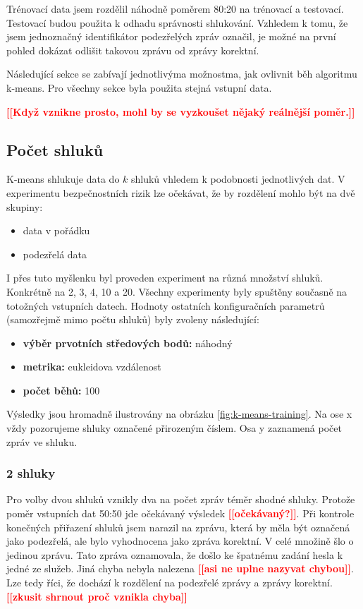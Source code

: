 \documentclass[thesis=M,czech]{FITthesis}[2012/10/20]
\newcommand{\todo}[1]{\textcolor{red}{\textbf{[[#1]]}}}
\begin{document}
		Trénovací data jsem rozdělil náhodně poměrem 80:20 na trénovací a testovací. Testovací budou použita k odhadu správnosti shlukování. Vzhledem k tomu, že jsem jednoznačný identifikátor podezřelých zpráv označil, je možné na první pohled dokázat odlišit takovou zprávu od zprávy korektní.
		
		Následující sekce se zabívají jednotlivýma možnostma, jak ovlivnit běh algoritmu k-means. Pro všechny sekce byla použita stejná vstupní data.
		
		\todo{Když vznikne prosto, mohl by se vyzkoušet nějaký reálnější poměr.}

		\subsection{Počet shluků}
			K-means shlukuje data do $k$ shluků vhledem k podobnosti jednotlivých dat. V experimentu bezpečnostních rizik lze očekávat, že by rozdělení mohlo být na dvě skupiny:
			
			\begin{itemize} 
				\item data v pořádku
				\item podezřelá data		
			\end{itemize}
		
			I přes tuto myšlenku byl proveden experiment na různá množství shluků. Konkrétně na 2, 3, 4, 10 a 20. Všechny experimenty byly spuštěny současně na totožných vstupních datech. Hodnoty ostatních konfiguračních parametrů (samozřejmě mimo počtu shluků) byly zvoleny následující:
			
			\begin{itemize} 
				\item \textbf{výběr prvotních středových bodů: } náhodný
				\item \textbf{metrika: } eukleidova vzdálenost
				\item \textbf{počet běhů: } 100		
			\end{itemize}
		
				Výsledky jsou hromadně ilustrovány na obrázku \ref{fig:k-means-training}. Na ose x vždy pozorujeme shluky označené přirozeným číslem. Osa y zaznamená počet zpráv ve shluku.
				
				\subsubsection{2 shluky}
				
				Pro volby dvou shluků vznikly dva na počet zpráv téměr shodné shluky. Protože poměr vstupních dat 50:50 jde očekávaný výsledek \todo{očekávaný?}. Při kontrole konečných přiřazení shluků jsem narazil na zprávu, která by měla být označená jako podezřelá, ale bylo vyhodnocena jako zpráva korektní. V celé množině šlo o jedinou zprávu. Tato zpráva oznamovala, že došlo ke špatnému zadání hesla k jedné ze služeb. Jiná chyba nebyla nalezena \todo{asi ne uplne nazyvat chybou}. Lze tedy říci, že dochází k rozdělení na podezřelé zprávy a zprávy korektní. \todo{zkusit shrnout proč vznikla chyba}
				
\end{document}
